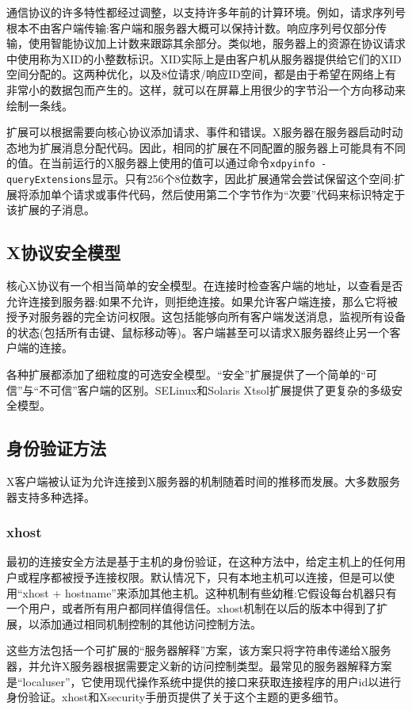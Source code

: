 通信协议的许多特性都经过调整，以支持许多年前的计算环境。例如，请求序列号根本不由客户端传输:客户端和服务器大概可以保持计数。响应序列号仅部分传输，使用智能协议加上计数来跟踪其余部分。类似地，服务器上的资源在协议请求中使用称为XID的小整数标识。XID实际上是由客户机从服务器提供给它们的XID空间分配的。这两种优化，以及8位请求/响应ID空间，都是由于希望在网络上有非常小的数据包而产生的。这样，就可以在屏幕上用很少的字节沿一个方向移动来绘制一条线。

扩展可以根据需要向核心协议添加请求、事件和错误。X服务器在服务器启动时动态地为扩展消息分配代码。因此，相同的扩展在不同配置的服务器上可能具有不同的值。在当前运行的X服务器上使用的值可以通过命令\lstinline|xdpyinfo -queryExtensions|显示。只有256个8位数字，因此扩展通常会尝试保留这个空间:扩展将添加单个请求或事件代码，然后使用第二个字节作为“次要”代码来标识特定于该扩展的子消息。


\subsection{X协议安全模型}

核心X协议有一个相当简单的安全模型。在连接时检查客户端的地址，以查看是否允许连接到服务器:如果不允许，则拒绝连接。如果允许客户端连接，那么它将被授予对服务器的完全访问权限。这包括能够向所有客户端发送消息，监视所有设备的状态(包括所有击键、鼠标移动等)。客户端甚至可以请求X服务器终止另一个客户端的连接。

各种扩展都添加了细粒度的可选安全模型。“安全”扩展提供了一个简单的“可信”与“不可信”客户端的区别。SELinux和Solaris Xtsol扩展提供了更复杂的多级安全模型。

\subsection{身份验证方法}

X客户端被认证为允许连接到X服务器的机制随着时间的推移而发展。大多数服务器支持多种选择。

\subsubsection{xhost}

最初的连接安全方法是基于主机的身份验证，在这种方法中，给定主机上的任何用户或程序都被授予连接权限。默认情况下，只有本地主机可以连接，但是可以使用“xhost + hostname”来添加其他主机。这种机制有些幼稚:它假设每台机器只有一个用户，或者所有用户都同样值得信任。xhost机制在以后的版本中得到了扩展，以添加通过相同机制控制的其他访问控制方法。

这些方法包括一个可扩展的“服务器解释”方案，该方案只将字符串传递给X服务器，并允许X服务器根据需要定义新的访问控制类型。最常见的服务器解释方案是“localuser”，它使用现代操作系统中提供的接口来获取连接程序的用户id以进行身份验证。xhost和Xsecurity手册页提供了关于这个主题的更多细节。
	
